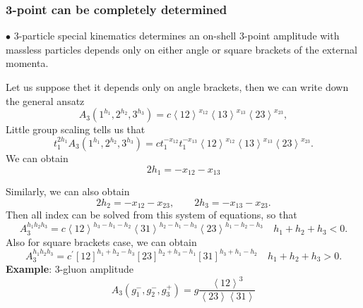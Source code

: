 \documentclass{beamer}
\newcommand{\avg}[1]{\left\langle #1 \right\rangle}
\begin{document}
\begin{frame}
    \frametitle{3-point can be completely determined}
    $\bullet$ 3-particle special kinematics determines an on-shell 3-point amplitude with massless particles depends only on either angle or square brackets of the external momenta.

    Let us suppose thet it depends only on angle brackets, then we can write down the general ansatz
    \begin{equation*}
        A_3(1^{h_1},2^{h_2},3^{h_3})=c\avg{12}^{x_{12}}\avg{13}^{x_{13}}\avg{23}^{x_{23}},
    \end{equation*}
    Little group scaling tells us that
    \begin{equation*}
        t_1^{2h_1} A_3(1^{h_1},2^{h_2},3^{h_3})=ct_1^{-x_{12}}t_1^{-x_{13}}\avg{12}^{x_{12}}\avg{13}^{x_{13}}\avg{23}^{x_{23}}.
    \end{equation*}
    We can obtain
    \begin{equation*}
        2h_1=-x_{12}-x_{13}
    \end{equation*}
\end{frame}

\begin{frame}
    Similarly, we can also obtain
    \begin{equation*}
        2h_2=-x_{12}-x_{23},\qquad 2h_3=-x_{13}-x_{23}.
    \end{equation*}
    Then all index can be solved from this system of equations, so that
    \begin{equation*}
        A_3^{h_1h_2h_3}=c\avg{12}^{h_3-h_1-h_2}\avg{31}^{h_2-h_1-h_3}\avg{23}^{h_1-h_2-h_3}\quad h_1+h_2+h_3<0.
    \end{equation*}
    Also for square brackets case, we can obtain
    \begin{equation*}
        A_3^{h_1h_2h_3}=c^{'}[12]^{h_1+h_2-h_3}[23]^{h_2+h_3-h_1}[31]^{h_3+h_1-h_2}\quad h_1+h_2+h_3>0.
    \end{equation*}
    \textbf{Example}: 3-gluon amplitude\\
    \begin{equation*}
        A_3(g_1^-,g_2^-,g_3^+)=g\frac{\avg{12}^3}{\avg{23}\!\avg{31}}
    \end{equation*}
\end{frame}
\end{document}
